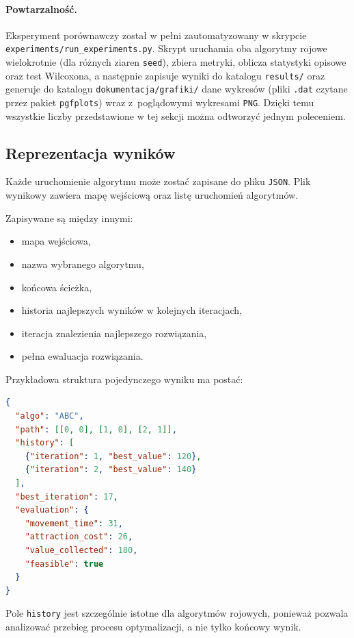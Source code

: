 \paragraph{Powtarzalność.}
Eksperyment porównawczy został w pełni zautomatyzowany w skrypcie
\texttt{experiments/run\_experiments.py}. Skrypt uruchamia oba algorytmy rojowe
wielokrotnie (dla różnych ziaren \texttt{seed}), zbiera metryki, oblicza
statystyki opisowe oraz test Wilcoxona, a następnie zapisuje wyniki do katalogu
\texttt{results/} oraz generuje do katalogu \texttt{dokumentacja/grafiki/} dane
wykresów (pliki \texttt{.dat} czytane przez pakiet \texttt{pgfplots}) wraz
z~poglądowymi wykresami \texttt{PNG}.
Dzięki temu wszystkie liczby przedstawione w tej sekcji można odtworzyć jednym
poleceniem.

\subsection{Reprezentacja wyników}

Każde uruchomienie algorytmu może zostać zapisane do pliku \texttt{JSON}.
Plik wynikowy zawiera mapę wejściową oraz listę uruchomień algorytmów.

Zapisywane są między innymi:
\begin{itemize}
    \item mapa wejściowa,
    \item nazwa wybranego algorytmu,
    \item końcowa ścieżka,
    \item historia najlepszych wyników w kolejnych iteracjach,
    \item iteracja znalezienia najlepszego rozwiązania,
    \item pełna ewaluacja rozwiązania.
\end{itemize}

Przykładowa struktura pojedynczego wyniku ma postać:

\begin{lstlisting}[language=json, caption={Przykładowa struktura wyniku}]
{
  "algo": "ABC",
  "path": [[0, 0], [1, 0], [2, 1]],
  "history": [
    {"iteration": 1, "best_value": 120},
    {"iteration": 2, "best_value": 140}
  ],
  "best_iteration": 17,
  "evaluation": {
    "movement_time": 31,
    "attraction_cost": 26,
    "value_collected": 180,
    "feasible": true
  }
}
\end{lstlisting}

Pole \texttt{history} jest szczególnie istotne dla algorytmów rojowych,
ponieważ pozwala analizować przebieg procesu optymalizacji, a nie tylko
końcowy wynik.

